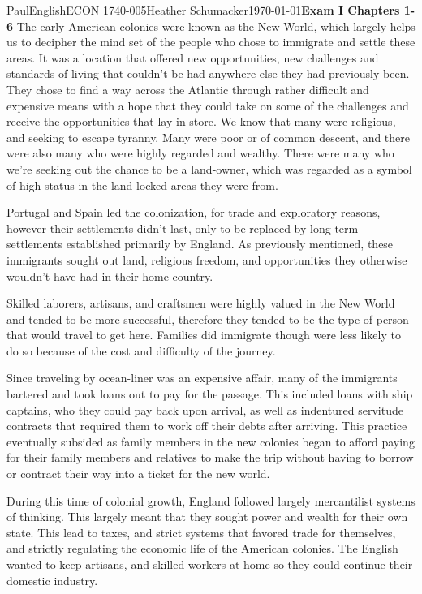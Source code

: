 \documentclass[12pt,letterpaper]{article}
\begin{document}
\begin{mla}{Paul}{English}{ECON 1740-005}{Heather
    Schumacker}{\today}{\textbf{Exam I Chapters 1-6}}
The early American colonies were known as the New World, which largely
helps us to decipher the mind set of the people who chose to
immigrate and settle these areas. It was a location that offered new
opportunities, new challenges and standards of living that couldn't be
had anywhere else they had previously been. They chose to find a way across
the Atlantic through rather difficult and expensive means with a hope
that they could take on some of the challenges and receive the
opportunities that lay in store. We know that many were religious, and seeking
to escape tyranny. Many were poor or of common descent, and there were
also many who were highly regarded and wealthy. There were many who
we're seeking out the chance to be a land-owner, which was regarded as
a symbol of high status in the land-locked areas they were from. 

Portugal and Spain led the colonization, for trade and exploratory
reasons, however their settlements didn't last, only to be replaced by
long-term settlements established primarily by England. As previously
mentioned, these immigrants sought out land, religious freedom, and
opportunities they otherwise wouldn't have had in their home country. 

Skilled laborers, artisans, and craftsmen were highly valued in the
New World and tended to be more successful, therefore they tended to
be the type of person that would travel to get here. Families did
immigrate though were less likely to do so because of the cost and
difficulty of the journey. 

Since traveling by ocean-liner was an expensive affair, many of the
immigrants bartered and took loans out to pay for the passage. This
included loans with ship captains, who they could pay back upon
arrival, as well as indentured servitude contracts that required them
to work off their debts after arriving. This practice eventually
subsided as family members in the new colonies began to afford paying
for their family members and relatives to make the trip without having
to borrow or contract their way into a ticket for the new world. 

During this time of colonial growth, England followed largely
mercantilist systems of thinking. This largely meant that they sought
power and wealth for their own state. This lead to taxes, and strict
systems that favored trade for themselves, and strictly regulating the
economic life of the American colonies. The English wanted to keep
artisans, and skilled workers at home so they could continue their
domestic industry. 


\end{mla}
\end{document}
